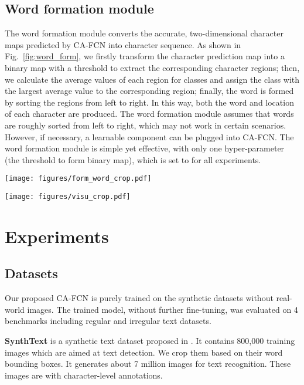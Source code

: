 \documentclass[letterpaper]{article} \usepackage{aaai19}  \usepackage{times}  \usepackage{helvet}  \usepackage{courier}  \usepackage{url}  \usepackage{graphicx}  \frenchspacing  \usepackage{multirow}
\begin{document}
\subsection{Word formation module}
The word formation module converts the accurate, two-dimensional character maps predicted by CA-FCN into character sequence. As shown in Fig.~\ref{fig:word_form}, we firstly transform the character prediction map into a binary map with a threshold to extract the corresponding character regions; then, we calculate the average values of each region for  classes and assign the class with the largest average value to the corresponding region; finally, the word is formed by sorting the regions from left to right. In this way, both the word and location of each character are produced. The word formation module assumes that words are roughly sorted from left to right, which may not work in certain scenarios. However, if necessary, a learnable component can be plugged into CA-FCN. The word formation module is simple yet effective, with only one hyper-parameter (the threshold to form binary map), which is set to  for all experiments.

\begin{figure*}[ht]
\centering
\texttt{[image: figures/form\_word\_crop.pdf]}
\caption{Illustration of the word formation module.}
\label{fig:word_form}
\end{figure*}

\begin{figure*}[ht]
\centering
\texttt{[image: figures/visu\_crop.pdf]}
\caption{Visualization of character prediction maps on IIIT and CUTE. The character prediction map generated by the CA-FCN is visualized with colors.}
\label{fig:visu}
\end{figure*}

\section{Experiments}
\subsection{Datasets}
Our proposed CA-FCN is purely trained on the synthetic datasets without real-world images. The trained model, without further fine-tuning,  was evaluated on 4 benchmarks including regular and irregular text datasets.

\textbf{SynthText} is a synthetic text dataset proposed in \cite{gupta2016synthetic}. It contains 800,000 training images which are aimed at text detection. We crop them based on their word bounding boxes. It generates about 7 million images for text recognition. These images are with character-level annotations.
\end{document}
